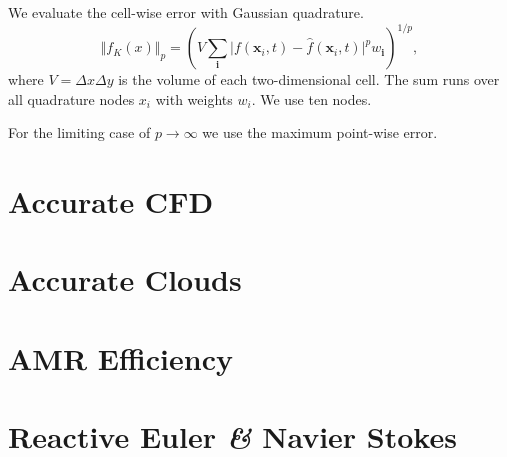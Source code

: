 We evaluate the cell-wise error with Gaussian quadrature.
 \begin{equation}
   \Vert f_K(x) \Vert_p = \left( V \sum_{\bm{i}} \vert f(\bm{x}_i, t) - \hat{f}(\bm{x}_i, t) \vert^p w_{{\bm{i}}}  \right)^{1/p},
 \end{equation}
where $V = \Delta x \Delta y$ is the volume of each two-dimensional cell.
The sum runs over all quadrature nodes $x_i$ with weights $w_i$.
We use ten nodes.

For the limiting case of $p \to \infty$ we use the maximum point-wise error.

\section{Accurate CFD}
\section{Accurate Clouds}
\section{AMR Efficiency}
\section{Reactive Euler \textit{\&} Navier Stokes}

